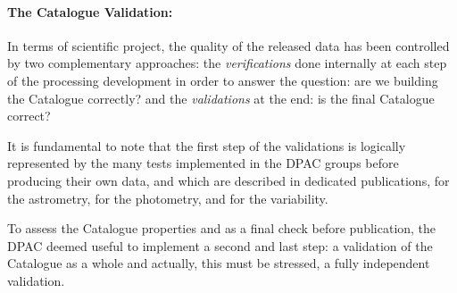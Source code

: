 \paragraph{The Catalogue Validation:}
In terms of scientific project, the quality of the released data has been controlled 
by two complementary approaches: the {\it verifications} done internally at each
step of the processing development in order to answer the question: are we building
the Catalogue correctly? and the {\it validations} at the end: is the
final Catalogue correct?

It is fundamental to note that the first step of the validations is logically 
represented by the many tests implemented in the {\gaia} DPAC 
groups before producing their own data, and which are described
in dedicated publications, \citet{DPACP-14} for the astrometry,
\citet{DPACP-11} for the photometry, and \citet{DPACP-15}
for the variability. 

To assess the Catalogue properties and as a final check before publication,
the DPAC deemed useful to implement a second and last step: a validation of the Catalogue
as a whole and actually, this must be stressed, a fully independent validation.  


